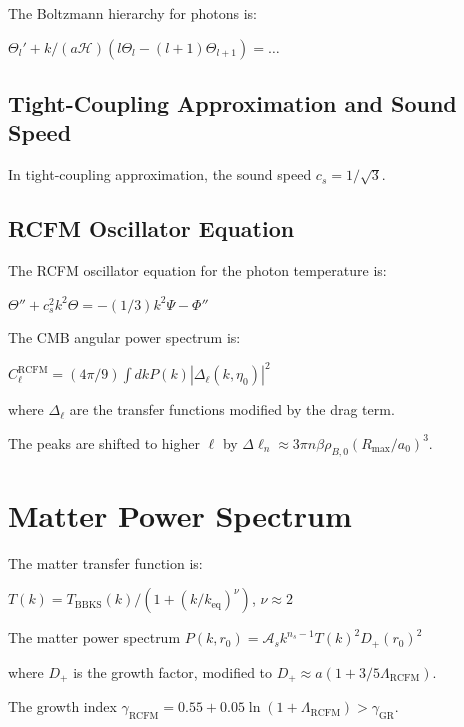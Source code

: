 \documentclass[10pt,twocolumn]{article}
\theoremstyle{definition}
\newcommand{\Rmax}{R_{\max}}
\newcommand{\Hcal}{\mathcal{H}}
\begin{document}
The Boltzmann hierarchy for photons is:

\( \Theta_{l}' + k / (a \Hcal) (l \Theta_{l} - (l+1) \Theta_{l+1}) = \dots \)

\subsection{Tight-Coupling Approximation and Sound Speed}

In tight-coupling approximation, the sound speed \( c_{s} = 1 / \sqrt{3} \).

\subsection{RCFM Oscillator Equation}

The RCFM oscillator equation for the photon temperature is:

\( \Theta'' + c_{s}^{2} k^{2} \Theta = - (1/3) k^{2} \Psi - \Phi'' \)

The CMB angular power spectrum is:

\( C_{\ell}^{\mathrm{RCFM}} = (4 \pi / 9) \int dk P(k) |\Delta_{\ell}(k, \eta_{0})|^{2} \)

where \( \Delta_{\ell} \) are the transfer functions modified by the drag term.

The peaks are shifted to higher \( \ell \) by \( \Delta \ell_{n} \approx 3 \pi n \beta \rho_{B,0} (\Rmax / a_{0})^{3} \).

\section{Matter Power Spectrum}
\label{sec:pk}

The matter transfer function is:

\( T(k) = T_{\mathrm{BBKS}}(k) / (1 + (k / k_{\mathrm{eq}})^{\nu}) \), \( \nu \approx 2 \) \citep{Bardeen1986}

The matter power spectrum \( P(k, r_{0}) = \mathcal{A}_{s} k^{n_{s}-1} T(k)^{2} D_{+}(r_{0})^{2} \)

where \( D_{+} \) is the growth factor, modified to \( D_{+} \approx a (1 + 3/5 \Lambda_{\mathrm{RCFM}}) \).

The growth index \( \gamma_{\mathrm{RCFM}} = 0.55 + 0.05 \ln(1 + \Lambda_{\mathrm{RCFM}}) > \gamma_{\mathrm{GR}} \).

\end{document}
